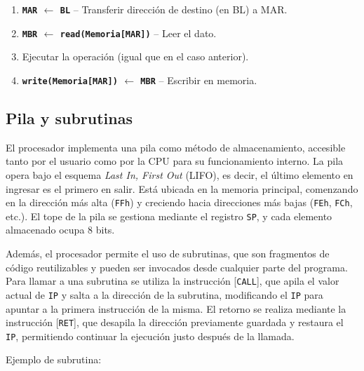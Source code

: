 \documentclass[12pt,oneside]{templates/unerthesis}
\providecommand{\tightlist}{%
  \setlength{\itemsep}{0pt}\setlength{\parskip}{0pt}}
\begin{document}
\begin{itemize}
\begin{itemize}
\begin{itemize}
\begin{itemize}
        \begin{enumerate}
        \def\labelenumi{\arabic{enumi}.}
        \setcounter{enumi}{3}
        \tightlist
        \item
          \textbf{\texttt{MAR} \(\leftarrow\) \texttt{BL}} -- Transferir dirección de destino (en BL) a MAR.
        \item
          \textbf{\texttt{MBR} \(\leftarrow\) \texttt{read(Memoria{[}MAR{]})}} -- Leer el dato.
        \item
          Ejecutar la operación (igual que en el caso anterior).
        \item
          \textbf{\texttt{write(Memoria{[}MAR{]})} \(\leftarrow\) \texttt{MBR}} -- Escribir en memoria.
        \end{enumerate}
      \end{itemize}
    \end{itemize}
  \end{itemize}
\end{itemize}

\hypertarget{pila-y-subrutinas}{%
\subsection{Pila y subrutinas}\label{pila-y-subrutinas}}

El procesador implementa una pila como método de almacenamiento, accesible tanto por el usuario como por la CPU para su funcionamiento interno. La pila opera bajo el esquema \emph{Last In, First Out} (LIFO), es decir, el último elemento en ingresar es el primero en salir. Está ubicada en la memoria principal, comenzando en la dirección más alta (\texttt{FFh}) y creciendo hacia direcciones más bajas (\texttt{FEh}, \texttt{FCh}, etc.). El tope de la pila se gestiona mediante el registro \texttt{SP}, y cada elemento almacenado ocupa 8 bits.

Además, el procesador permite el uso de subrutinas, que son fragmentos de código reutilizables y pueden ser invocados desde cualquier parte del programa. Para llamar a una subrutina se utiliza la instrucción {[}\texttt{CALL}{]}, que apila el valor actual de \texttt{IP} y salta a la dirección de la subrutina, modificando el \texttt{IP} para apuntar a la primera instrucción de la misma. El retorno se realiza mediante la instrucción {[}\texttt{RET}{]}, que desapila la dirección previamente guardada y restaura el \texttt{IP}, permitiendo continuar la ejecución justo después de la llamada.

Ejemplo de subrutina:
\end{document}

